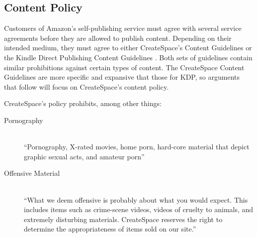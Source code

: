 \documentclass[11pt]{article}
\begin{document}
\begin{multicols}{2}
\subsection{Content Policy}

Customers of Amazon's self-publishing service must agree with several service agreements before they are allowed to publish content.  Depending on their intended medium, they must agree to either CreateSpace's Content Guidelines \cite{CreateSpaceContentGuidelines} or the Kindle Direct Publishing Content Guidelines \cite{AmazonKDPContentGuidelines}.  Both sets of guidelines contain similar prohibitions against certain types of content.  The CreateSpace Content Guidelines are more specific and expansive that those for KDP, so arguments that follow will focus on CreateSpace's content policy.

CreateSpace's policy prohibits, among other things:

\begin{description}
\item[Pornography] \hfill \\
      ``Pornography, X-rated movies, home porn, hard-core material that depict graphic sexual acts, and amateur porn''
\item[Offensive Material] \hfill \\
      ``What we deem offensive is probably about what you would expect. This includes items such as crime-scene videos, videos of cruelty to animals, and extremely disturbing materials. CreateSpace reserves the right to determine the appropriateness of items sold on our site.''

\end{description}


\end{multicols}
\end{document}
